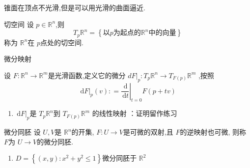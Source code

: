 \documentclass[../../古典微分几何.tex]{subfiles}
\begin{document}
\hspace*{\fill} 


\begin{example}[不光滑的光滑曲面极限]
    锥面在顶点不光滑,但是可以用光滑的曲面逼近.
\end{example}

\hspace*{\fill} 

\begin{definition}{切空间}
    设 \(  p \in \mathbb{R} ^{n}  \),则 \[
    T_{p}\mathbb{R} ^{n} =  \left\{ \text{以}p\text{为起点的}\mathbb{R} ^{n}\text{中的向量} \right\}
    \] 称为 \(  \mathbb{R} ^{n}  \)在 \(  p  \)点处的切空间.  
\end{definition}

\begin{definition}{微分映射}

    设 \(  F: \mathbb{R} ^{n}\to \mathbb{R} ^{m}  \)是光滑函数,定义它的微分 \(  dF|_{p}: T_{p}\mathbb{R} ^{n}\to T_{F\left( p \right) } \mathbb{R} ^{m} \)  ,按照 \[
    \,\mathrm{d} F|_{p} \left( v \right): =   \left. \frac{\,\mathrm{d}  }{\,\mathrm{d} t }  \right|_{t= 0}F\left( p+ t v \right)  
    \]
    
\end{definition}

\begin{remark}
   \begin{enumerate}
    \item  \(  \left. \,\mathrm{d} F \right|_{p}  \)是 \(  T_{p}\mathbb{R} ^{n}  \)到 \(  T_{F\left( p \right) }\mathbb{R} ^{m}  \)  的线性映射 ：证明留作练习
   \end{enumerate}
   
\end{remark}


\begin{definition}{微分同胚}
    设 \(  U,V  \)是 \(  \mathbb{R} ^{n}  \)的开集, \(  F: U\to V  \)是可微的双射,且 \(  F  \)的逆映射也可微,
    则称 \(  F  \)为 \(  U\to V  \)的微分同胚.      
\end{definition}

\begin{example}
    \begin{enumerate}
        \item  \(  D =  \left\{ \left( x,y \right): x^{2}+ y^{2}\le 1  \right\}  \)微分同胚于 \(  \mathbb{R} ^{2}  \)  
    \end{enumerate}
    
\end{example}
\end{document}
